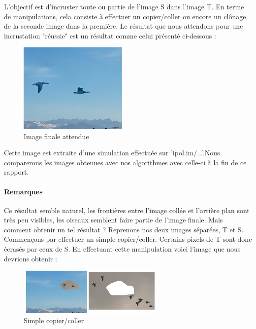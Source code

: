 L'objectif est d'incruster toute ou partie de l'image S dans l'image T. En terme de manipulations, cela consiste à effectuer un copier/coller ou encore un clônage de la seconde image dans la première.
Le résultat que nous attendons pour une incrustation "réussie" est un résultat comme celui présenté ci-dessous : 
    
\begin{center}
\begin{figure}[!htb]
   \centering
     \includegraphics[width = 150pt]{Images/clonage_done.png}
     \caption{Image  finale attendue}
\end{figure}
\end{center}
Cette image est extraite d'une simulation effectuée sur 'ipol.im/...'.Nous comparerons les images obtenues avec nos algorithmes avec celle-ci à la fin de ce rapport.\newline
\paragraph{Remarques}
Ce résultat semble naturel, les frontières entre l'image collée et l'arrière plan sont très peu visibles, les oiseaux semblent faire partie de l'image finale.
Mais comment obtenir un tel résultat ? 
\newline
Reprenons nos deux images séparées, T et S.  Commençons par effectuer un simple copier/coller. Certains pixels de T sont donc écrasés par ceux de S. En effectuant cette manipulation voici l'image que nous devrions obtenir : 
\begin{center}
\begin{figure}[H]
     \centering
     \includegraphics[width = 200pt]{Images/collage1.jpg}
     \caption{Simple copier/coller}
\end{figure}
\end{center}

